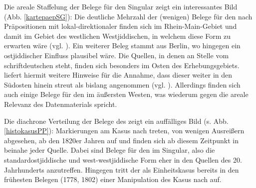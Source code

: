 Die areale Staffelung der Belege für den Singular zeigt ein interessantes Bild (Abb. \ref{kartepaepSG}): Die deutliche Mehrzahl der (wenigen) Belege für den  nach Präpositionen mit lokal-direktionaler  finden sich im Rhein-Main-Gebiet und damit im Gebiet des westlichen Westjiddischen, in welchem diese Form zu erwarten wäre (vgl. \cite{FleischerSchaefer2012}). Ein weiterer Beleg stammt aus Berlin, wo hingegen ein ostjiddischer Einfluss plausibel wäre. Die Quellen, in denen  an Stelle vom schriftdeutschen  steht, finden sich besonders im Osten des Erhebungsgebiets.  liefert hiermit weitere Hinweise für die Annahme, dass dieser  weiter in den Südosten hinein streut als bislang angenommen (vgl. \cite{FleischerSchaefer2012}). Allerdings finden sich auch einige Belege für den  im äußersten Westen, was wiederum gegen die areale Relevanz des Datenmaterials spricht.

Die diachrone Verteilung der Belege des  zeigt ein auffälliges Bild (s. Abb. \ref{histokasusPP}): Markierungen am Kasus nach  treten, von wenigen Ausreißern abgesehen, ab den 1820er Jahren auf und finden sich ab diesem Zeitpunkt in beinahe jeder Quelle. Dabei sind Belege für den  im Singular, also die standardostjiddische und west-westjiddische Form eher in den Quellen des 20. Jahrhunderts anzutreffen. Hingegen tritt der  als Einheitskasus bereits in den frühesten Belegen (1778, 1802) einer Manipulation des Kasus nach  auf.\\


